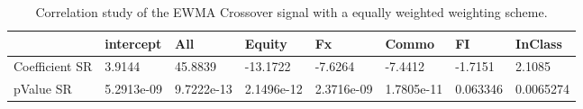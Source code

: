 \begin{table}[H]
\centering
\begin{tabular}{llllllll}
& intercept & All & Equity & Fx & Commo & FI & InClass \\ 
\hline 
Coefficient SR & 3.9144 & 45.8839 & -13.1722 & -7.6264 & -7.4412 & -1.7151 & 2.1085 \\ 
pValue SR & 5.2913e-09 & 9.7222e-13 & 2.1496e-12 & 2.3716e-09 & 1.7805e-11 & 0.063346 & 0.0065274 \\ 
\hline
\end{tabular}
\caption{Correlation study of the EWMA Crossover signal with a equally weighted weighting scheme.}
\label{MBBSEWNR_CORR}
\end{table}
